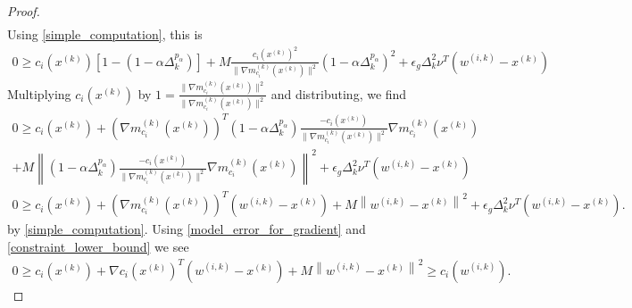 \documentclass{article}
\theoremstyle{case}
\newcommand{\xk}{{x^{(k)}}}
\newcommand{\dk}{\Delta_k}
\newcommand{\wik}{{w^{(i, k)}}}
\newcommand{\gmcik}{{\nabla m_{c_i}^{(k)}(\xk)}}
\begin{document}
\begin{proof}
\begin{align*}
\end{align*}
Using \cref{simple_computation}, this is
\begin{align*}
0 \ge c_i(\xk)\left[1 - \left(1 - \alpha \dk^{p_{\alpha}}\right)\right] + M \frac {c_i(\xk)^2}{\|\gmcik\|^2}\left(1 - \alpha \dk^{p_{\alpha}}\right)^2 + \epsilon_g \dk^2\nu^T \left(\wik - \xk\right)
\end{align*}
Multiplying $c_i(\xk)$ by $1 = \frac{\|\gmcik\|^2}{\|\gmcik\|^2}$ and distributing, we find
\begin{align*}
0 \ge c_i(\xk) + \left(\gmcik\right)^T\left(1 - \alpha \dk^{p_{\alpha}}\right)\frac{-c_i(\xk)}{\|\gmcik\|^2}\gmcik  \\
+ M \left\|\left(1 - \alpha \dk^{p_{\alpha}}\right)\frac{-c_i(\xk)}{\|\gmcik\|^2}\gmcik\right\|^2
+ \epsilon_g \dk^2\nu^T \left(\wik - \xk\right) \\
0 \ge c_i(\xk) + \left(\gmcik\right)^T\left(\wik - \xk\right)+ M \left\|\wik - \xk\right\|^2  + \epsilon_g \dk^2\nu^T \left(\wik - \xk\right).
\end{align*}
by \cref{simple_computation}.
Using \cref{model_error_for_gradient} and \cref{constraint_lower_bound} we see
\begin{align}
0 \ge c_i(\xk) + \nabla c_i(\xk)^T\left(\wik - \xk \right) + M \left\|\wik - \xk\right\|^2 \ge c_i(\wik). \label{c_is_negative}
\end{align}


\end{proof}
\end{document}
